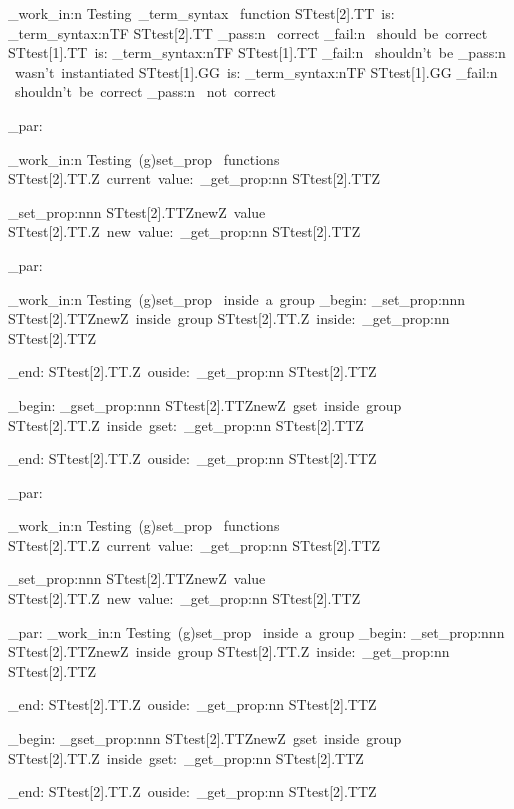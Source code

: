 \documentclass{article}
\begin{document}
\sttests_work_in:n {Testing~_term_syntax ~function}
STtest[2].TT~is:
\starray_term_syntax:nTF {STtest[2].TT}
  {\sttests_pass:n {~correct}}
  {\sttests_fail:n {~should~be~correct}}
STtest[1].TT~is:
\starray_term_syntax:nTF {STtest[1].TT}
  {\sttests_fail:n {~shouldn't~be}}
  {\sttests_pass:n {~wasn't~instantiated}}
STtest[1].GG~is:
\starray_term_syntax:nTF {STtest[1].GG}
  {\sttests_fail:n {~shouldn't~be~correct}}
  {\sttests_pass:n {~not~correct}}


\sttests_par:

\sttests_work_in:n {Testing~(g)set_prop ~functions}
STtest[2].TT.Z~current~value:~\starray_get_prop:nn {STtest[2].TT}{Z}\par
\starray_set_prop:nnn {STtest[2].TT}{Z}{newZ~value}
STtest[2].TT.Z~new~value:~\starray_get_prop:nn {STtest[2].TT}{Z}\par

\sttests_par:

\sttests_work_in:n {Testing~(g)set_prop ~inside~a~group}
\group_begin:
  \starray_set_prop:nnn {STtest[2].TT}{Z}{newZ~inside~group}
  STtest[2].TT.Z~inside:~\starray_get_prop:nn {STtest[2].TT}{Z}\par
\group_end:
  STtest[2].TT.Z~ouside:~\starray_get_prop:nn {STtest[2].TT}{Z}\par

\group_begin:
  \starray_gset_prop:nnn {STtest[2].TT}{Z}{newZ~gset~inside~group}
  STtest[2].TT.Z~inside~gset:~\starray_get_prop:nn {STtest[2].TT}{Z}\par
\group_end:
  STtest[2].TT.Z~ouside:~\starray_get_prop:nn {STtest[2].TT}{Z}\par

\sttests_par:

\sttests_work_in:n {Testing~(g)set_prop ~functions}
STtest[2].TT.Z~current~value:~\starray_get_prop:nn {STtest[2].TT}{Z}\par
\starray_set_prop:nnn {STtest[2].TT}{Z}{newZ~value}
STtest[2].TT.Z~new~value:~\starray_get_prop:nn {STtest[2].TT}{Z}\par


\sttests_par:
\sttests_work_in:n {Testing~(g)set_prop ~inside~a~group}
\group_begin:
  \starray_set_prop:nnn {STtest[2].TT}{Z}{newZ~inside~group}
  STtest[2].TT.Z~inside:~\starray_get_prop:nn {STtest[2].TT}{Z}\par
\group_end:
  STtest[2].TT.Z~ouside:~\starray_get_prop:nn {STtest[2].TT}{Z}\par

\group_begin:
  \starray_gset_prop:nnn {STtest[2].TT}{Z}{newZ~gset~inside~group}
  STtest[2].TT.Z~inside~gset:~\starray_get_prop:nn {STtest[2].TT}{Z}\par
\group_end:
  STtest[2].TT.Z~ouside:~\starray_get_prop:nn {STtest[2].TT}{Z}\par
\end{document}
